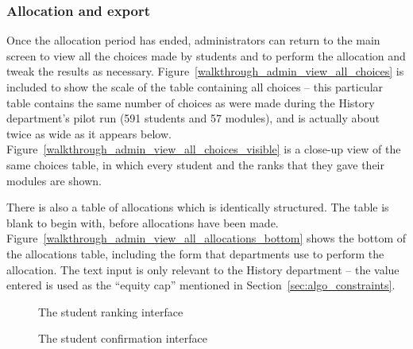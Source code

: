 
\subsubsection{Allocation and export}

Once the allocation period has ended, administrators can return to the main
screen to view all the choices made by students and to perform the allocation
and tweak the results as necessary.
Figure~\ref{walkthrough_admin_view_all_choices} is included to show the scale
of the table containing all choices -- this particular table contains the same
number of choices as were made during the History department's pilot run (591
students and 57 modules), and is actually about twice as wide as it appears
below. Figure~\ref{walkthrough_admin_view_all_choices_visible} is a close-up
view of the same choices table, in which every student and the ranks that they
gave their modules are shown.

There is also a table of allocations which is identically structured. The
table is blank to begin with, before allocations have been made.
Figure~\ref{walkthrough_admin_view_all_allocations_bottom} shows the bottom of
the allocations table, including the form that departments use to perform the
allocation. The text input is only relevant to the History department -- the
value entered is used as the ``equity cap'' mentioned in
Section~\ref{sec:algo_constraints}.


\begin{landscape}
  \begin{figure}
    \begin{minipage}{0.5\linewidth}
      \centering
      \caption{The student ranking interface}
      \label{walkthrough_student_rank}
    \end{minipage}
    \begin{minipage}{0.5\linewidth}
      \centering
      \caption{The student confirmation interface}
      \label{walkthrough_student_confirm}
    \end{minipage}
  \end{figure}
\end{landscape}

